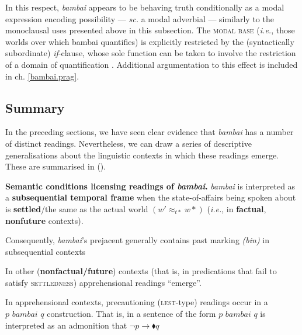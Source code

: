 In this respect, \textit{bambai} appears to be behaving truth conditionally as a modal expression encoding possibility --- \textit{sc.} a modal adverbial --- similarly to the monoclausal uses presented above in this subsection. The \textsc{modal base} (\textit{i.e.}, those worlds over which bambai quantifies) is explicitly restricted by the (syntactically subordinate) \textit{if}-clause, whose sole function can be taken to involve the restriction of a domain of quantification \citep[cf.][]{Kratzer1979,Lewis1975,VonFintel1994,Roberts1989,Roberts1995}. Additional argumentation to this effect is included in ch. \ref{bambai.prag}.



\subsection{Summary}

In the preceding sections, we have seen clear evidence that \textit{bambai} has a number of distinct readings. Nevertheless, we can draw a series of descriptive generalisations about the linguistic contexts in which these readings emerge. These are summarised in (\nextx).%

		\pex[everylabel=\bf\it]\textbf{Semantic conditions licensing readings of \textit{bambai}.}
			\a	\textit{bambai} is interpreted as a \textbf{subsequential temporal frame} when the state-of-affairs being spoken about is \textbf{settled}/the same as the actual world $(w'\approx_{t*} w*)$  (\textit{i.e.}, in \textbf{factual}, \textbf{nonfuture}  contexts).
			
			Consequently, \textit{bambai}'s prejacent generally contains past marking \textit{(bin)} in subsequential contexts
				
			\a	In other (\textbf{nonfactual/future}) contexts (that is, in predications that fail to satisfy \textsc{settledness}) apprehensional readings ``emerge''. 
				
			\a	In apprehensional contexts, precautioning (\textsc{lest}-type) readings occur in a $p \textit{ bambai } q$ construction. That is, in a sentence of the form $p \textit{ bambai } q$ is interpreted as an admonition that $ \boldsymbol\neg p\to\blacklozenge q $ \xe%
	
